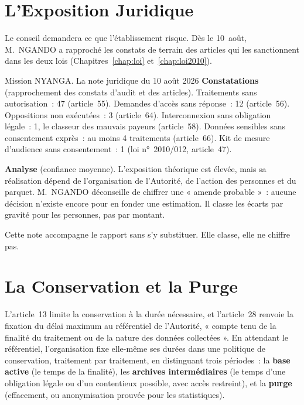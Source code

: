 \section{L'Exposition Juridique}
\label{sec:c16-exposition}

Le conseil demandera ce que l'établissement risque. Dès le 10~août,
M.~NGANDO a rapproché les constats de terrain des articles qui les
sanctionnent dans les deux lois (Chapitres~\ref{chap:loi}
et~\ref{chap:loi2010}).

\begin{boxscenario}{Mission NYANGA. La note juridique du 10 août 2026}
\textbf{Constatations} (rapprochement des constats d'audit et des
articles). Traitements sans autorisation~: 47 (article~55). Demandes
d'accès sans réponse~: 12 (article~56). Oppositions non exécutées~: 3
(article~64). Interconnexion sans obligation légale~: 1, le classeur des
mauvais payeurs (article~58). Données sensibles sans consentement exprès~:
au moins 4 traitements (article~66). Kit de mesure d'audience sans
consentement~: 1 (loi n°~2010/012, article~47).

\textbf{Analyse} (confiance moyenne). L'exposition théorique est élevée,
mais sa réalisation dépend de l'organisation de l'Autorité, de l'action
des personnes et du parquet. M.~NGANDO déconseille de chiffrer une
« amende probable »~: aucune décision n'existe encore pour en fonder une
estimation. Il classe les écarts par gravité pour les personnes, pas par
montant.
\end{boxscenario}

Cette note accompagne le rapport sans s'y substituer. Elle classe, elle ne
chiffre pas.

\section{La Conservation et la Purge}
\label{sec:c13-conservation}

L'article~13 limite la conservation à la durée nécessaire, et l'article~28
renvoie la fixation du délai maximum au référentiel de l'Autorité, « compte
tenu de la finalité du traitement ou de la nature des données collectées ».
En attendant le référentiel, l'organisation fixe elle-même ses durées dans
une politique de conservation, traitement par traitement, en distinguant
trois périodes~: la \textbf{base active} (le temps de la finalité), les
\textbf{archives intermédiaires} (le temps d'une obligation légale ou d'un
contentieux possible, avec accès restreint), et la \textbf{purge}
(effacement, ou anonymisation prouvée pour les statistiques).

